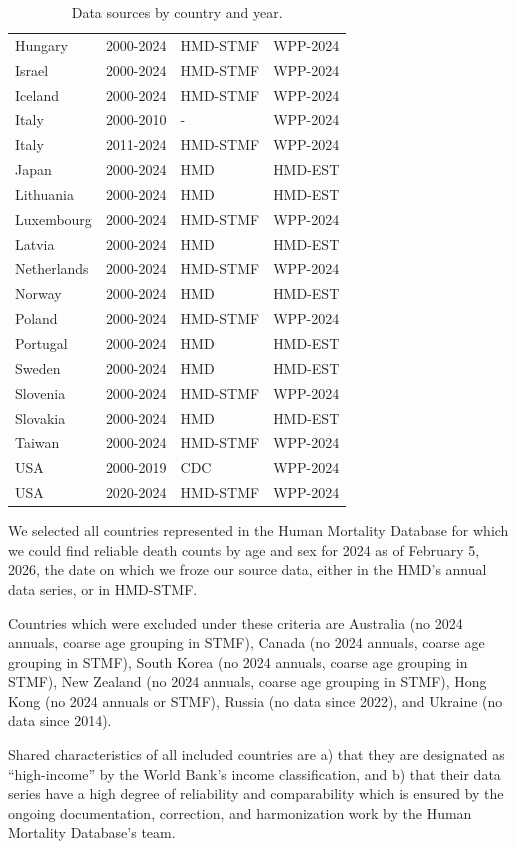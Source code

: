 \documentclass[12pt]{article}
\begin{document}
\begin{table}[ht!]
\begin{tabular*}{\linewidth}{@{\extracolsep{\fill}}llll}
Hungary & 2000-2024 & HMD-STMF & WPP-2024 \\ 
Israel & 2000-2024 & HMD-STMF & WPP-2024 \\ 
Iceland & 2000-2024 & HMD-STMF & WPP-2024 \\ 
Italy & 2000-2010 & - & WPP-2024 \\ 
Italy & 2011-2024 & HMD-STMF & WPP-2024 \\ 
Japan & 2000-2024 & HMD & HMD-EST \\ 
Lithuania & 2000-2024 & HMD & HMD-EST \\ 
Luxembourg & 2000-2024 & HMD-STMF & WPP-2024 \\ 
Latvia & 2000-2024 & HMD & HMD-EST \\ 
Netherlands & 2000-2024 & HMD-STMF & WPP-2024 \\ 
Norway & 2000-2024 & HMD & HMD-EST \\ 
Poland & 2000-2024 & HMD-STMF & WPP-2024 \\ 
Portugal & 2000-2024 & HMD & HMD-EST \\ 
Sweden & 2000-2024 & HMD & HMD-EST \\ 
Slovenia & 2000-2024 & HMD-STMF & WPP-2024 \\ 
Slovakia & 2000-2024 & HMD & HMD-EST \\ 
Taiwan & 2000-2024 & HMD-STMF & WPP-2024 \\ 
USA & 2000-2019 & CDC & WPP-2024 \\ 
USA & 2020-2024 & HMD-STMF & WPP-2024 \\ 
\bottomrule
\end{tabular*}
\caption{Data sources by country and year.}
\label{tab:sources}
\end{table}

We selected all countries represented in the Human Mortality Database for which we could find reliable death counts by age and sex for 2024 as of February 5, 2026, the date on which we froze our source data, either in the HMD's annual data series, or in HMD-STMF.

Countries which were excluded under these criteria are Australia (no 2024 annuals, coarse age grouping in STMF), Canada (no 2024 annuals, coarse age grouping in STMF), South Korea (no 2024 annuals, coarse age grouping in STMF), New Zealand (no 2024 annuals, coarse age grouping in STMF), Hong Kong (no 2024 annuals or STMF), Russia (no data since 2022), and Ukraine (no data since 2014).

Shared characteristics of all included countries are a) that they are designated as ``high-income'' by the World Bank's income classification, and b) that their data series have a high degree of reliability and comparability which is ensured by the ongoing documentation, correction, and harmonization work by the Human Mortality Database's team.
\end{document}
